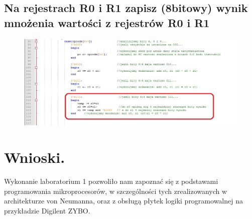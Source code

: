 \documentclass[12pt,a4paper]{article}
\begin{document}
	\subsection{Na rejestrach R0 i R1 zapisz (8bitowy) wynik mnożenia wartości z rejestrów R0 i R1}
	\begin{figure}[!ht]
		\centering
		\includegraphics[width=1\linewidth]{graphics/code2}
	\end{figure}
	\section{Wnioski.}
	Wykonanie laboratorium 1 pozwoliło nam zapoznać się z podstawami programowania mikroprocesorów, w szczególności tych zrealizowanych w architekturze von Neumanna, oraz z obsługą płytek logiki programowalnej na przykładzie Digilent ZYBO.
	
\end{document}
